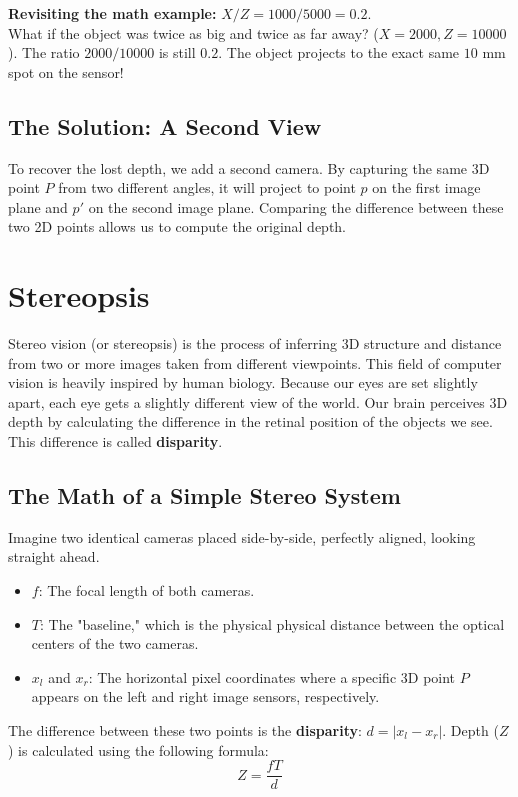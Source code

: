 \documentclass{report}
\begin{document}
\textbf{Revisiting the math example:} $X/Z = 1000/5000 = 0.2$. \\
What if the object was twice as big and twice as far away? ($X = 2000, Z = 10000$). The ratio $2000 / 10000$ is still $0.2$. The
object projects to the exact same $10\text{ mm}$ spot on the sensor!

\section{The Solution: A Second View}
To recover the lost depth, we add a second camera. By capturing the same 3D point $P$ from two different angles, it will project
to point $p$ on the first image plane and $p'$ on the second image plane. Comparing the difference between these two 2D points
allows us to compute the original depth.





\chapter{Stereopsis}
Stereo vision (or stereopsis) is the process of inferring 3D structure and distance from two or more images taken from different viewpoints. This field of computer vision is heavily inspired by human biology. Because our eyes are set slightly apart, each eye gets a slightly different view of the world. Our brain perceives 3D depth by calculating the difference in the retinal position of the objects we see. This difference is called \textbf{disparity}.

\section{The Math of a Simple Stereo System}
Imagine two identical cameras placed side-by-side, perfectly aligned, looking straight ahead.
\begin{itemize}
    \item $f$: The focal length of both cameras.
    \item $T$: The "baseline," which is the physical physical distance between the optical centers of the two cameras.
    \item $x_l$ and $x_r$: The horizontal pixel coordinates where a specific 3D point $P$ appears on the left and right image sensors, respectively.
\end{itemize}

The difference between these two points is the \textbf{disparity}: $d = |x_l - x_r|$. Depth ($Z$) is calculated using the following formula:
\begin{equation}
Z = \frac{fT}{d}
\end{equation}
\end{document}
